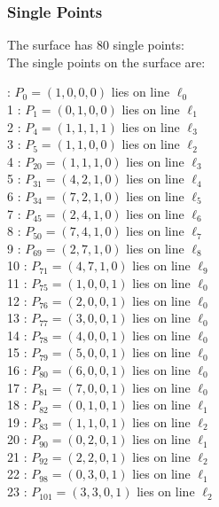 \documentclass{article}
\begin{document}
{\subsubsection*{Single Points}
The surface has 80 single points:\\
The single points on the surface are:\\
\begin{multicols}{2}
 : $P_{0}=( 1, 0, 0, 0 )$ lies on line $\ell_{0}$\\
1 : $P_{1}=( 0, 1, 0, 0 )$ lies on line $\ell_{1}$\\
2 : $P_{4}=( 1, 1, 1, 1 )$ lies on line $\ell_{3}$\\
3 : $P_{5}=( 1, 1, 0, 0 )$ lies on line $\ell_{2}$\\
4 : $P_{20}=( 1, 1, 1, 0 )$ lies on line $\ell_{3}$\\
5 : $P_{31}=( 4, 2, 1, 0 )$ lies on line $\ell_{4}$\\
6 : $P_{34}=( 7, 2, 1, 0 )$ lies on line $\ell_{5}$\\
7 : $P_{45}=( 2, 4, 1, 0 )$ lies on line $\ell_{6}$\\
8 : $P_{50}=( 7, 4, 1, 0 )$ lies on line $\ell_{7}$\\
9 : $P_{69}=( 2, 7, 1, 0 )$ lies on line $\ell_{8}$\\
10 : $P_{71}=( 4, 7, 1, 0 )$ lies on line $\ell_{9}$\\
11 : $P_{75}=( 1, 0, 0, 1 )$ lies on line $\ell_{0}$\\
12 : $P_{76}=( 2, 0, 0, 1 )$ lies on line $\ell_{0}$\\
13 : $P_{77}=( 3, 0, 0, 1 )$ lies on line $\ell_{0}$\\
14 : $P_{78}=( 4, 0, 0, 1 )$ lies on line $\ell_{0}$\\
15 : $P_{79}=( 5, 0, 0, 1 )$ lies on line $\ell_{0}$\\
16 : $P_{80}=( 6, 0, 0, 1 )$ lies on line $\ell_{0}$\\
17 : $P_{81}=( 7, 0, 0, 1 )$ lies on line $\ell_{0}$\\
18 : $P_{82}=( 0, 1, 0, 1 )$ lies on line $\ell_{1}$\\
19 : $P_{83}=( 1, 1, 0, 1 )$ lies on line $\ell_{2}$\\
20 : $P_{90}=( 0, 2, 0, 1 )$ lies on line $\ell_{1}$\\
21 : $P_{92}=( 2, 2, 0, 1 )$ lies on line $\ell_{2}$\\
22 : $P_{98}=( 0, 3, 0, 1 )$ lies on line $\ell_{1}$\\
23 : $P_{101}=( 3, 3, 0, 1 )$ lies on line $\ell_{2}$\\

\end{multicols}}
\end{document}
